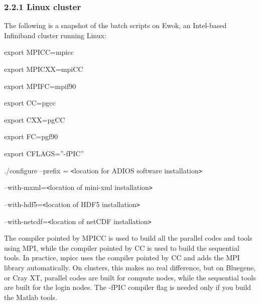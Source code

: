 \vspace{10pt}
\subsubsection*{{\large \textbf{2.2.1 Linux cluster}}}

\vspace{10pt}
The following is a snapshot of the batch scripts on Ewok, an Intel-based Infiniband 
cluster running Linux:

\vspace{10pt}
export MPICC=mpicc

\vspace{10pt}
export MPICXX=mpiCC

\vspace{10pt}
export MPIFC=mpif90

\vspace{10pt}
export CC=pgcc

\vspace{10pt}
export CXX=pgCC

\vspace{10pt}
export FC=pgf90

\vspace{10pt}
export CFLAGS=''-fPIC''

\vspace{10pt}
./configure --prefix = \texttt{<}location for ADIOS software installation\texttt{>}

\vspace{10pt}
--with-mxml=\texttt{<}location of mini-xml installation\texttt{>}

\vspace{10pt}
\parindent=43pt
--with-hdf5=\texttt{<}location of HDF5 installation\texttt{>}

\vspace{10pt}
\parindent=0pt
--with-netcdf=\texttt{<}location of netCDF installation\texttt{>}

\vspace{22pt}
The compiler pointed by MPICC is used to build all the parallel codes and tools 
using MPI, while the compiler pointed by CC is used to build the sequential tools. 
In practice, mpicc uses the compiler pointed by CC and adds the MPI library automatically. 
On clusters, this makes no real difference, but on Bluegene, or Cray XT, parallel 
codes are built for compute nodes, while the sequential tools are built for the 
login nodes. The -fPIC compiler flag is needed only if you build the Matlab tools.\label{HToc84890224}\label{HToc212016599}\label{HToc212016841}\label{HToc182553332}

